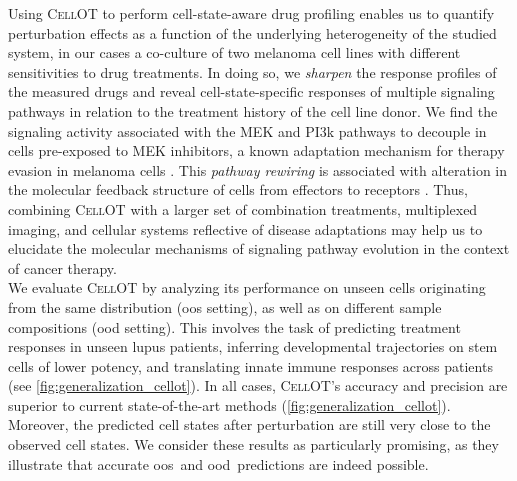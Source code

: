 Using \textsc{CellOT} to perform cell-state-aware drug profiling enables us to quantify perturbation effects as a function of the underlying heterogeneity of the studied system, in our cases a co-culture of two melanoma cell lines with different sensitivities to drug treatments. In doing so, we \textit{sharpen} the response profiles of the measured drugs and reveal cell-state-specific responses of multiple signaling pathways in relation to the treatment history of the cell line donor. We find the signaling activity associated with the MEK and PI3k pathways to decouple in cells pre-exposed to MEK inhibitors, a known adaptation mechanism for therapy evasion in melanoma cells \citep{kun2021mek}. This \textit{pathway rewiring} is associated with alteration in the molecular feedback structure of cells from effectors to receptors \citep{kun2021mek, turke2012mek}. Thus, combining \textsc{CellOT} with a larger set of combination treatments, multiplexed imaging, and cellular systems reflective of disease adaptations may help us to elucidate the molecular mechanisms of signaling pathway evolution in the context of cancer therapy. \\

We evaluate \textsc{CellOT} by analyzing its performance on unseen cells originating from the same distribution (\acrshort{oos} setting), as well as on different sample compositions (\acrshort{ood} setting). 
This involves the task of predicting treatment responses in unseen lupus patients, inferring developmental trajectories on stem cells of lower potency, and translating innate immune responses across patients (see \cref{fig:generalization_cellot}). 
In all cases, \textsc{CellOT}'s accuracy and precision are superior to current state-of-the-art methods (\cref{fig:generalization_cellot}). Moreover, the predicted cell states after perturbation are still very close to the observed cell states. We consider these results as particularly promising, as they illustrate that accurate \acrshort{oos}~and \acrshort{ood}~predictions are indeed possible. \\

